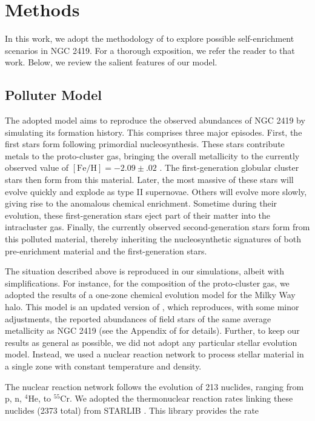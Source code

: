 \documentclass[twocolumn]{aastex6}
\newcommand{\nuclei}[2]{$^{#1}${#2}}
\begin{document}
\section{Methods} \label{sec:methods}
In this work, we adopt the methodology of \citet{Iliadis_2016} to explore possible self-enrichment scenarios in NGC 2419. For a thorough exposition, we refer the reader to that work. Below, we review the salient features of our model.
\subsection{Polluter Model} \label{sec:methos1}
\par
The adopted model aims to reproduce the observed abundances of NGC 2419 by simulating its formation history. This comprises three major episodes. First, the first stars form following primordial nucleosynthesis. These stars contribute metals to the proto-cluster gas, bringing the overall metallicity to the currently observed value of $[\text{Fe}/\text{H}]= -2.09 \pm .02$ \citep{Mucciarelli_2012}. The first-generation globular cluster stars then form from this material. 
Later, the most massive of these stars will evolve quickly and explode as type II supernovae. 
Others will evolve more slowly, giving rise to the anomalous chemical enrichment. 
Sometime during their evolution, these first-generation stars eject part of their matter into the intracluster gas.
Finally, the currently observed second-generation stars form from this polluted material, thereby inheriting the nucleosynthetic signatures of both pre-enrichment material and the first-generation stars. 
\par
The situation described above is reproduced in our simulations, albeit with simplifications. 
For instance, for the composition of the proto-cluster gas, we adopted the results of a one-zone chemical evolution model for the Milky Way halo. This model
is an updated version of \citet{Goswami_2000}, which reproduces, with some minor adjustments, the reported abundances of field stars of the same average metallicity as NGC 2419 (see the Appendix of \citet{Iliadis_2016} for details).
Further, to keep our results as general as possible, we did not adopt any particular stellar evolution model. Instead, we used a nuclear reaction network to process stellar material in a single zone with constant temperature and density.
\par
The nuclear reaction network follows the evolution of 213 nuclides, ranging from p, n, \nuclei{4}{He}, to \nuclei{55}{Cr}. We adopted the thermonuclear reaction rates linking these nuclides (2373 total) from STARLIB \citep{Sallaska_2013}. This library provides the rate
\end{document}
